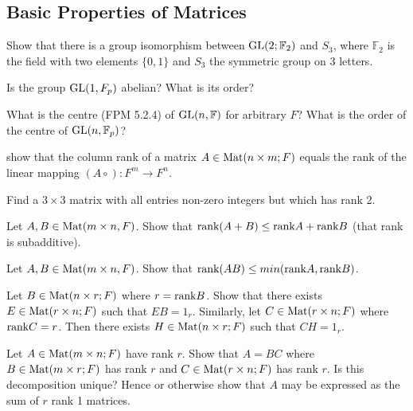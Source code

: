 \subsection{Basic Properties of Matrices}
\item Show that there is a group isomorphism between $\text{GL}(2; \mathbb{F}_{2})$ and $S_{3}$, where $\mathbb{F}_{2}$ is the field with two elements $\{0, 1\}$ and $S_{3}$ the symmetric group on 3 letters.
\item Is the group $\text{GL}(1, F_{p})$ abelian? What is its order?
\item What is the centre (FPM 5.2.4) of $\text{GL}(n, \mathbb{F})$ for arbitrary $F$? What is the order of the centre of $\text{GL}(n, \mathbb{F}_{p})$?
\item show that the column rank of a matrix $A \in \text{Mat}(n \times m; F)$ equals the rank of the linear mapping $(A \circ) : F^{m} \to F^{n}$.
\item Find a $3 \times 3$ matrix with all entries non-zero integers but which has rank 2.
\item Let $A, B \in \text{Mat}(m \times n, F)$. Show that $\text{rank}(A + B) \le \text{rank} A + \text{rank} B$ (that rank is subadditive).
\item Let $A, B \in \text{Mat}(m \times n, F)$. Show that $\text{rank}(AB) \le min(\text{rank} A, \text{rank} B)$.
\item Let $B \in \text{Mat}(n \times r; F)$ where $r = \text{rank} B$. Show that there exists $E \in \text{Mat}(r \times n; F)$ such that $EB=1_{r}$. Similarly, let $C \in \text{Mat}(r \times n; F)$ where $\text{rank} C = r$. Then there exists $H \in \text{Mat}(n \times r; F)$ such that $CH=1_{r}$.
\item Let $A \in \text{Mat}(m \times n; F)$ have rank $r$. Show that $A = BC$ where $B \in \text{Mat}(m \times r; F)$ has rank $r$ and $C \in \text{Mat}(r \times n; F)$ has rank $r$. Is this decomposition unique? Hence or otherwise show that $A$ may be expressed as the sum of $r$ rank 1 matrices.
